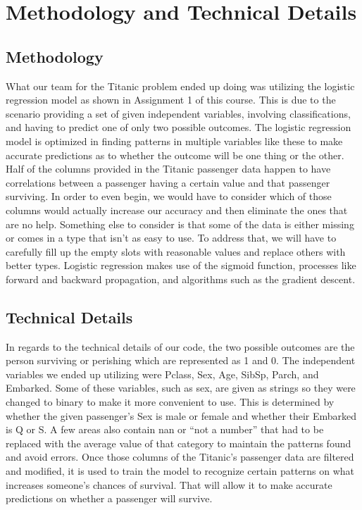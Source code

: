 \documentclass{IEEE}
\begin{document}
\section{Methodology and Technical Details}

\subsection{Methodology}
    What our team for the Titanic problem ended up doing was utilizing the logistic regression model as shown in Assignment 1 of this course. This is due to the scenario providing a set of given independent variables, involving classifications, and having to predict one of only two possible outcomes. The logistic regression model is optimized in finding patterns in multiple variables like these to make accurate predictions as to whether the outcome will be one thing or the other. Half of the columns provided in the Titanic passenger data happen to have correlations between a passenger having a certain value and that passenger surviving. In order to even begin, we would have to consider which of those columns would actually increase our accuracy and then eliminate the ones that are no help. Something else to consider is that some of the data is either missing or comes in a type that isn’t as easy to use. To address that, we will have to carefully fill up the empty slots with reasonable values and replace others with better types. Logistic regression makes use of the sigmoid function, processes like forward and backward propagation, and algorithms such as the gradient descent.
\subsection{Technical Details}
In regards to the technical details of our code, the two possible outcomes are the person surviving or perishing which are represented as 1 and 0. The independent variables we ended up utilizing were Pclass, Sex, Age, SibSp, Parch, and Embarked. Some of these variables, such as sex, are given as strings so they were changed to binary to make it more convenient to use. This is determined by whether the given passenger’s Sex is male or female and whether their Embarked is Q or S. A few areas also contain nan or “not a number” that had to be replaced with the average value of that category to maintain the patterns found and avoid errors. Once those columns of the Titanic’s passenger data are filtered and modified, it is used to train the model to recognize certain patterns on what increases someone’s chances of survival. That will allow it to make accurate predictions on whether a passenger will survive.
\end{document}
